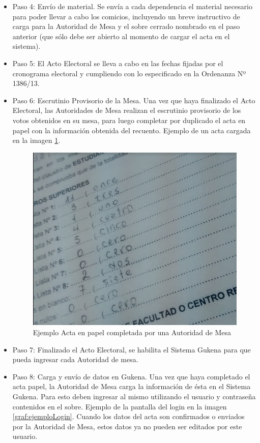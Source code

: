 \begin{itemize}
\item Paso 4: Envío de material. Se envía a cada dependencia el material necesario para poder llevar a cabo los comicios, incluyendo un breve instructivo de carga para la Autoridad de Mesa y el sobre cerrado nombrado en el paso anterior (que sólo debe ser abierto al momento de cargar el acta en el sistema).
\item Paso 5: El Acto Electoral se lleva a cabo en las fechas fijadas por el cronograma electoral y cumpliendo con lo especificado en la Ordenanza Nº 1386/13.
\item Paso 6: Escrutinio Provisorio de la Mesa. 
Una vez que haya finalizado el Acto Electoral, las Autoridades de Mesa realizan el escrutinio provisorio de los votos obtenidos en su mesa, para luego completar por duplicado el acta en papel con la información obtenida del recuento. Ejemplo de un acta cargada en la imagen \ref{graf:ejemploActa}.

\begin{figure}[h!]
    \begin{center}
        \includegraphics[scale=0.25]{img/f4P4qmrKXY.png}
    \end{center}
  \caption{Ejemplo Acta en papel completada por una Autoridad de Mesa}
  \label{graf:ejemploActa}
\end{figure}

\item Paso 7: Finalizado el Acto Electoral, se habilita el Sistema Gukena para que pueda ingresar cada Autoridad de mesa.
\item Paso 8: Carga y envío de datos en Gukena. Una vez que haya completado el acta papel, la Autoridad de Mesa carga la información de ésta en el Sistema Gukena. Para esto deben ingresar al mismo utilizando el usuario y contraseña contenidos en el sobre. Ejemplo de la pantalla del login en la imagen \ref{graf:ejemploLogin}.
Cuando los datos del acta son confirmados o enviados por la Autoridad de Mesa, estos datos ya no pueden ser editados por este usuario.


\end{itemize}
